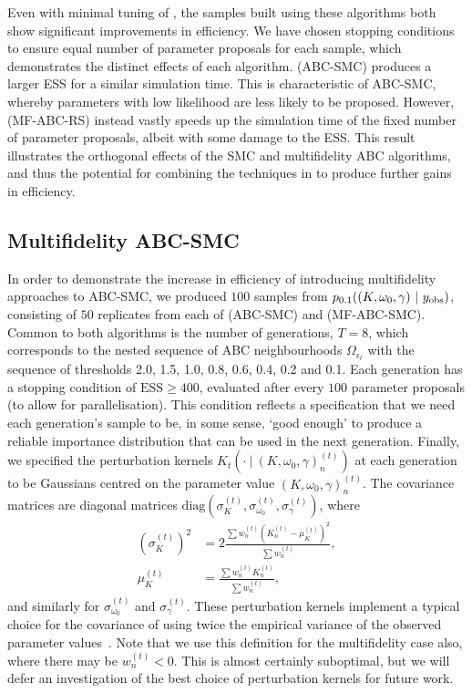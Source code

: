 \documentclass[review]{siamonline190516}
\begin{document}
Even with minimal tuning of , the samples built using these algorithms both show significant improvements in efficiency.
We have chosen stopping conditions to ensure equal number of parameter proposals for each sample, which demonstrates the distinct effects of each algorithm.
 (ABC-SMC) produces a larger ESS for a similar simulation time.
This is characteristic of ABC-SMC, whereby parameters with low likelihood are less likely to be proposed.
However,  (MF-ABC-RS) instead vastly speeds up the simulation time of the fixed number of parameter proposals, albeit with some damage to the ESS.
This result illustrates the orthogonal effects of the SMC and multifidelity ABC algorithms, and thus the potential for combining the techniques in  to produce further gains in efficiency.

\subsection{Multifidelity ABC-SMC}
\label{s:Results}

In order to demonstrate the increase in efficiency of introducing multifidelity approaches to ABC-SMC, we produced $100$ samples from $p_{0.1}((K, \omega_0, \gamma)~|~y_{\mathrm{obs}})$, consisting of $50$ replicates from each of  (ABC-SMC) and  (MF-ABC-SMC).
Common to both algorithms is the number of generations, $T=8$, which corresponds to the nested sequence of ABC neighbourhoods $\Omega_{\epsilon_t}$ with the sequence of thresholds 2.0, 1.5, 1.0, 0.8, 0.6, 0.4, 0.2 and 0.1.
Each generation has a stopping condition of $\mathrm{ESS} \geq 400$, evaluated after every $100$ parameter proposals (to allow for parallelisation).
This condition reflects a specification that we need each generation's sample to be, in some sense, `good enough' to produce a reliable importance distribution that can be used in the next generation.
Finally, we specified the perturbation kernels $K_t(\cdot~|~(K, \omega_0, \gamma)^{(t)}_n)$ at each generation to be Gaussians centred on the parameter value $(K, \omega_0, \gamma)^{(t)}_n$.
The covariance matrices are diagonal matrices $\mathrm{diag}(\sigma_K^{(t)}, \sigma_{\omega_0}^{(t)}, \sigma_\gamma^{(t)})$, where 
\begin{align*}
(\sigma_K^{(t)})^2 &= 2 \frac{\sum w_n^{(t)} (K_n^{(t)} - \mu_K^{(t)})^2}{\sum w_n^{(t)}}, \\
\mu_K^{(t)} &= \frac{\sum w_n^{(t)} K_n^{(t)} }{\sum w_n^{(t)}},
\end{align*}
and similarly for $\sigma_{\omega_0}^{(t)}$ and $\sigma_\gamma^{(t)}$.
These perturbation kernels implement a typical choice for the covariance of using twice the empirical variance of the observed parameter values~\cite{Beaumont2009,Filippi2013}.
Note that we use this definition for the multifidelity case also, where there may be $w^{(t)}_n<0$.
This is almost certainly suboptimal, but we will defer an investigation of the best choice of perturbation kernels for future work.
\end{document}
